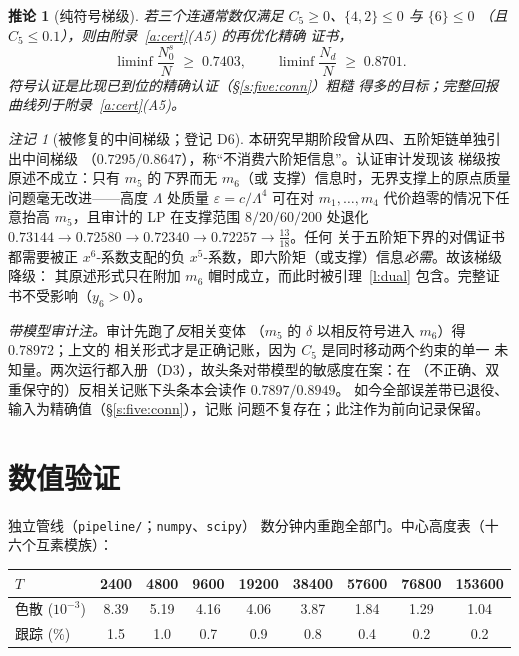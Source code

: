 \documentclass[11pt]{article}
\numberwithin{equation}{section}
\newtheorem{corollary}[theorem]{推论}
\theoremstyle{definition}
\theoremstyle{remark}
\newtheorem{remark}[theorem]{注记}
\begin{document}
\begin{corollary}[纯符号梯级]\label{c:signs}
若三个连通常数仅满足 $C_5\ge0$、$\{4,2\}\le0$ 与 $\{6\}\le0$
（且 $C_5\le0.1$），则由附录~\ref{a:cert}(A5) 的再优化精确
证书，
\[
\liminf\frac{N_0^{s}}{N}\;\ge\;0.7403,\qquad
\liminf\frac{N_d}{N}\;\ge\;0.8701 .
\]
符号认证是比现已到位的精确认证（\S\ref{s:five:conn}）粗糙
得多的目标；完整回报曲线列于附录~\ref{a:cert}(A5)。
\end{corollary}

\begin{remark}[被修复的中间梯级；登记 D6]\label{r:rung}
本研究早期阶段曾从四、五阶矩链单独引出中间梯级
（$0.7295/0.8647$），称``不消费六阶矩信息''。认证审计发现该
梯级按原述不成立：只有 $m_5$ 的\emph{下}界而无 $m_6$（或
支撑）信息时，无界支撑上的原点质量问题毫无改进——高度
$\Lambda$ 处质量 $\varepsilon=c/\Lambda^{4}$ 可在对
$m_1,\dots,m_4$ 代价趋零的情况下任意抬高 $m_5$，且审计的 LP
在支撑范围 $8/20/60/200$ 处退化
$0.73144\to0.72580\to0.72340\to0.72257\to\tfrac{13}{18}$。任何
关于五阶矩下界的对偶证书都需要被正 $x^6$-系数支配的负
$x^5$-系数，即六阶矩（或支撑）信息\emph{必需}。故该梯级降级：
其原述形式只在附加 $m_6$ 帽时成立，而此时被引理~\ref{l:dual}
包含。完整证书不受影响（$y_6>0$）。
\end{remark}

\medskip
\noindent\emph{带模型审计注。}审计先跑了\emph{反}相关变体
（$m_5$ 的 $\delta$ 以相反符号进入 $m_6$）得 $0.78972$；上文的
相关形式才是正确记账，因为 $C_5$ 是同时移动两个约束的单一
未知量。两次运行都入册（D3），故头条对带模型的敏感度在案：在
（不正确、双重保守的）反相关记账下头条本会读作 $0.7897/0.8949$。
如今全部误差带已退役、输入为精确值（\S\ref{s:five:conn}），记账
问题不复存在；此注作为前向记录保留。

\section{数值验证}\label{s:faces}

独立管线（\texttt{pipeline/}；\texttt{numpy}、\texttt{scipy}）
数分钟内重跑全部门。中心高度表（十六个互素模族）：

\begin{center}
\begin{tabular}{lcccccccc}
$T$ & 2400 & 4800 & 9600 & 19200 & 38400 & 57600 & 76800 & 153600\\
\hline
色散 ($10^{-3}$) & 8.39 & 5.19 & 4.16 & 4.06 & 3.87 & 1.84
& 1.29 & 1.04\\
跟踪 (\%) & 1.5 & 1.0 & 0.7 & 0.9 & 0.8 & 0.4 & 0.2 & 0.2\\
\end{tabular}
\end{center}
\end{document}

